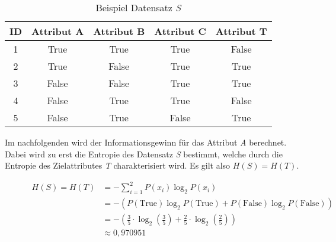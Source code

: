 \begin{center}
    \begin{table}[H]
        \centering
        \begin{tabularx}{0.8\linewidth}{ccccc}
            \toprule
            \textbf{ID} & \textbf{Attribut A} & \textbf{Attribut B} & \textbf{Attribut C} & \textbf{Attribut T}\\
            \toprule

            1 & True    & True  & True  & False \\
            2 & True    & False & True  & True \\
            3 & False   & False & True  & True \\
            4 & False   & True  & True  & False \\
            5 & False   & True  & False & True \\

            \bottomrule
        \end{tabularx}
        \caption{Beispiel Datensatz \textit{S} \autocite{Informat29:online}}
        \label{table:gain}
    \end{table}
\end{center}

Im nachfolgenden wird der Informationsgewinn für das Attribut \textit{A} berechnet. Dabei wird zu erst die Entropie des Datensatz \textit{S} bestimmt, welche durch die Entropie des Zielattributes \textit{T} charakterisiert wird. Es gilt also $H(S) = H(T)$.

\begin{figure}[htbp]
    \centering
    \begin{align*}
        H(S) = H(T) &= - \sum\limits_{i=1}^{2} P(x_{i}) \log_{2} P(x_{i}) \\
                    &= - ( P(\text{True}) \log_{2} P(\text{True}) + P(\text{False}) \log_{2} P(\text{False}) ) \\
                    &= - \left( \frac{3}{5} \cdot \log_{2} \left(\frac{3}{5}\right) + \frac{2}{5} \cdot \log_{2} \left(\frac{2}{5}\right)\right)\\
                    &\approx 0,970951
    \end{align*}
\end{figure}

